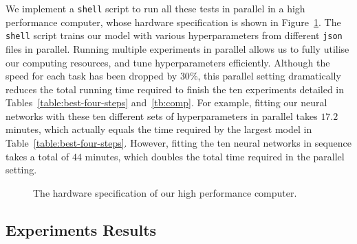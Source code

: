 We implement a \texttt{shell} script to run all these tests in parallel in a high performance computer, whose hardware specification is shown in Figure~\ref{fig:hardware}. The \texttt{shell} script trains our model with various hyperparameters from different 
\texttt{json} files in parallel. 
Running multiple experiments in parallel allows us to fully utilise our computing resources, and tune hyperparameters efficiently. Although the speed for each task has been dropped by $30\%$, this parallel setting dramatically reduces the total running time required to finish the ten experiments detailed in Tables~\ref{table:best-four-steps} and~\ref{tb:comp}. For example, fitting our neural networks with these ten different sets of hyperparameters in parallel takes $17.2$ minutes, which actually equals the time required by the largest model in  Table~\ref{table:best-four-steps}. However, fitting the ten neural networks in sequence takes a total of $44$ minutes, which doubles the total time required in the parallel setting.
\begin{figure}
    \caption{The hardware specification of our high performance computer.}
    \label{fig:hardware}
\end{figure}
\subsection{Experiments Results}
